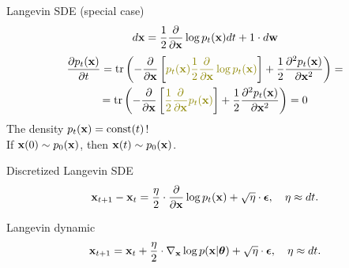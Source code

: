 \begin{frame}{Langevin SDE (special case)}
	\[
		d \mathbf{x} = \frac{1}{2} \frac{\partial}{\partial \mathbf{x}} \log p_t(\mathbf{x}) d t + 1 \cdot d \mathbf{w}
	\]
	\begin{multline*}
		\frac{\partial p_t(\bx)}{\partial t} =  \text{tr} \left(- \frac{\partial}{\partial \bx}\left[ {\color{olive}p_t(\bx) \frac{1}{2} \frac{\partial}{\partial \bx} \log p_t(\bx)} \right]  + \frac{1}{2} \frac{\partial^2 p_t(\bx)}{\partial \bx^2} \right) = \\
		= \text{tr} \left(- \frac{\partial}{\partial \bx}\left[ {\color{olive}\frac{1}{2} \frac{\partial}{\partial \bx} p_t(\bx) } \right]  + \frac{1}{2} \frac{\partial^2 p_t(\bx)}{\partial \bx^2} \right) = 0
	\end{multline*}
	The density $p_t(\mathbf{x}) = \text{const}(t)$! \\ If $\mathbf{x}(0) \sim p_0(\mathbf{x})$, then $\mathbf{x}(t) \sim p_0(\mathbf{x})$.
	\begin{block}{Discretized Langevin SDE}
		\vspace{-0.3cm}
		\[
			\mathbf{x}_{t + 1} - \mathbf{x}_t = \frac{\eta}{2} \cdot \frac{\partial}{\partial \mathbf{x}} \log p_t(\mathbf{x}) + \sqrt{\eta} \cdot \boldsymbol{\epsilon}, \quad \eta \approx dt.
		\]
		\vspace{-0.4cm}
	\end{block}
	\begin{block}{Langevin dynamic}
		\vspace{-0.3cm}
		\[
			\mathbf{x}_{t + 1} = \mathbf{x}_t + \frac{\eta}{2} \cdot \nabla_{\mathbf{x}} \log p(\mathbf{x} | \boldsymbol{\theta}) + \sqrt{\eta} \cdot \boldsymbol{\epsilon}, \quad \eta \approx dt.
		\]
		\vspace{-0.3cm}
	\end{block}
\end{frame}
